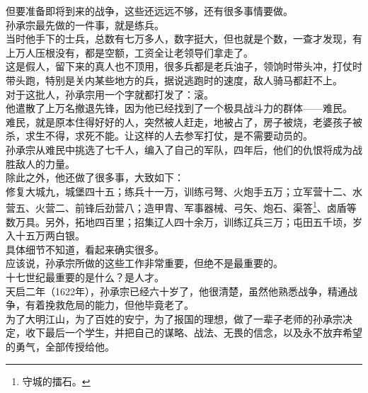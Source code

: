 \begin{multicols}{\theparacolNo}
但要准备即将到来的战争，这些还远远不够，还有很多事情要做。\\

孙承宗最先做的一件事，就是练兵。\\

当时他手下的士兵，总数有七万多人，数字挺大，但也就是个数，一查才发现，有上万人压根没有，都是空额，工资全让老领导们拿走了。\\

这是假人，留下来的真人也不顶用，很多兵都是老兵油子，领饷时带头冲，打仗时带头跑，特别是关内某些地方的兵，据说逃跑时的速度，敌人骑马都赶不上。\\

对于这批人，孙承宗用一个字就都打发了：滚。\\

他遣散了上万名撤退先锋，因为他已经找到了一个极具战斗力的群体——难民。\\

难民，就是原本住得好好的人，突然被人赶走，地被占了，房子被烧，老婆孩子被杀，求生不得，求死不能。让这样的人去参军打仗，是不需要动员的。\\

孙承宗从难民中挑选了七千人，编入了自己的军队，四年后，他们的仇恨将成为战胜敌人的力量。\\

除此之外，他还做了很多事，大致如下：\\

修复大城九，城堡四十五；练兵十一万，训练弓弩、火炮手五万；立军营十二、水营五、火营二、前锋后劲营八；造甲胄、军事器械、弓矢、炮石、渠答\footnote{守城的擂石。}、卤盾等数万具。另外，拓地四百里；招集辽人四十余万，训练辽兵三万；屯田五千顷，岁入十五万两白银。\\

具体细节不知道，看起来确实很多。\\

应该说，孙承宗所做的这些工作非常重要，但绝不是最重要的。\\

十七世纪最重要的是什么？是人才。\\

天启二年（1622年），孙承宗已经六十岁了，他很清楚，虽然他熟悉战争，精通战争，有着挽救危局的能力，但他毕竟老了。\\

为了大明江山，为了百姓的安宁，为了报国的理想，做了一辈子老师的孙承宗决定，收下最后一个学生，并把自己的谋略、战法、无畏的信念，以及永不放弃希望的勇气，全部传授给他。\\


\end{multicols}
